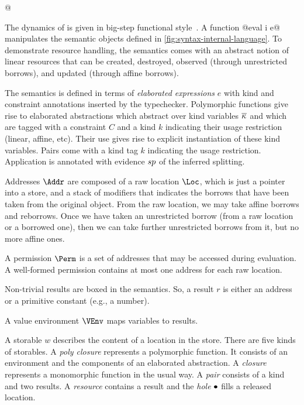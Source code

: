 \lstMakeShortInline[style=rule,basicstyle=\normalsize\normalfont]@

The dynamics of \lang is given in big-step
functional
style~\cite{siek13:_type_safet_three_easy_lemmas,DBLP:conf/esop/OwensMKT16,
  DBLP:conf/popl/AminR17}.  A function
@eval \Store \Perm \VEnv i e@
manipulates the semantic objects defined in
\cref{fig:syntax-internal-language}.
To demonstrate resource handling, the semantics comes with an abstract
notion of linear resources that can be created, destroyed, observed
(through unrestricted borrows), and
updated (through affine borrows).

The semantics is defined in terms of \emph{elaborated expressions} $e$
with kind and constraint annotations inserted by the typechecker.
Polymorphic functions give rise to elaborated
abstractions which abstract over kind variables $\overline{\kappa_{{}}}$ and
which are tagged with a constraint $C$ and a kind $k$ indicating their
usage restriction (linear, affine, etc). Their use
gives rise to explicit instantiation of these kind variables. Pairs
come with a kind tag $k$ indicating the usage restriction. Application
is annotated with evidence $sp$ of the inferred splitting. 

Addresses $\Addr$ are composed of a raw location $\Loc$, which is just
a pointer into a store, and a stack of modifiers that indicates the
borrows that have been taken from the original object. From the raw
location, we may take affine borrows and reborrows. Once we have
taken an unrestricted borrow (from a raw location or a borrowed one),
then we can take further unrestricted borrows from it, but no more
affine ones.

A permission $\Perm$ is a set of addresses that may be accessed during
evaluation. A well-formed permission contains at most one address for each raw
location.

Non-trivial results are boxed in the  semantics. So, a result
$r$ is either an address or a primitive constant (e.g., a number).

A value environment $\VEnv$  maps variables to results.

A storable $w$ describes the content of a location in the store. There are five
kinds of storables. A \emph{poly closure} represents a polymorphic
function. It consists of an environment and the components of an
elaborated abstraction. A \emph{closure} represents a monomorphic
function in the usual way. A \emph{pair}
consists of a kind and two results. A \emph{resource} contains
a result and the \emph{hole} $\bullet$ fills a released location.

